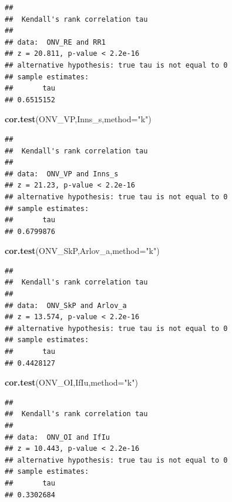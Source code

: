 \documentclass[]{article}
\newenvironment{Shaded}{\begin{snugshade}}{\end{snugshade}}
\newcommand{\DataTypeTok}[1]{\textcolor[rgb]{0.13,0.29,0.53}{#1}}
\newcommand{\KeywordTok}[1]{\textcolor[rgb]{0.13,0.29,0.53}{\textbf{#1}}}
\newcommand{\NormalTok}[1]{#1}
\newcommand{\StringTok}[1]{\textcolor[rgb]{0.31,0.60,0.02}{#1}}
\begin{document}
\begin{verbatim}
## 
##  Kendall's rank correlation tau
## 
## data:  ONV_RE and RR1
## z = 20.811, p-value < 2.2e-16
## alternative hypothesis: true tau is not equal to 0
## sample estimates:
##       tau 
## 0.6515152
\end{verbatim}

\begin{Shaded}
\begin{Highlighting}[]
\KeywordTok{cor.test}\NormalTok{(ONV_VP,Inns_s,}\DataTypeTok{method=}\StringTok{"k"}\NormalTok{)}
\end{Highlighting}
\end{Shaded}

\begin{verbatim}
## 
##  Kendall's rank correlation tau
## 
## data:  ONV_VP and Inns_s
## z = 21.23, p-value < 2.2e-16
## alternative hypothesis: true tau is not equal to 0
## sample estimates:
##       tau 
## 0.6799876
\end{verbatim}

\begin{Shaded}
\begin{Highlighting}[]
\KeywordTok{cor.test}\NormalTok{(ONV_SkP,Arlov_a,}\DataTypeTok{method=}\StringTok{"k"}\NormalTok{)}
\end{Highlighting}
\end{Shaded}

\begin{verbatim}
## 
##  Kendall's rank correlation tau
## 
## data:  ONV_SkP and Arlov_a
## z = 13.574, p-value < 2.2e-16
## alternative hypothesis: true tau is not equal to 0
## sample estimates:
##       tau 
## 0.4428127
\end{verbatim}

\begin{Shaded}
\begin{Highlighting}[]
\KeywordTok{cor.test}\NormalTok{(ONV_OI,IfIu,}\DataTypeTok{method=}\StringTok{"k"}\NormalTok{)}
\end{Highlighting}
\end{Shaded}

\begin{verbatim}
## 
##  Kendall's rank correlation tau
## 
## data:  ONV_OI and IfIu
## z = 10.443, p-value < 2.2e-16
## alternative hypothesis: true tau is not equal to 0
## sample estimates:
##       tau 
## 0.3302684
\end{verbatim}
\end{document}
